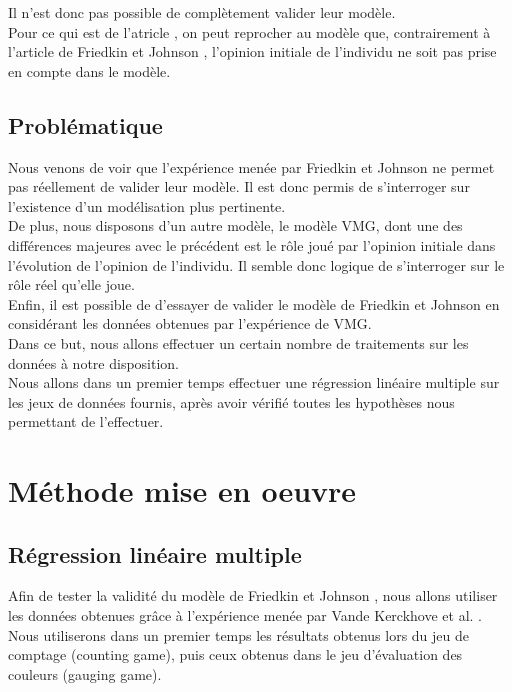 \documentclass{scrreprt}
\begin{document}
\begin{multicols}{2}
Il n'est donc pas possible de complètement valider leur modèle.\\

Pour ce qui est de l'atricle \cite{VMG}, on peut reprocher au modèle que, contrairement à l'article de Friedkin et Johnson \cite{FJ}, l'opinion initiale de l'individu ne soit pas prise en compte dans le modèle.

\section{Problématique}

Nous venons de voir que l’expérience menée par Friedkin et Johnson ne permet pas réellement de valider leur modèle. Il est donc permis de s'interroger sur l'existence d'un modélisation plus pertinente.\\

De plus, nous disposons d’un autre modèle, le modèle VMG, dont une des différences majeures avec le précédent est le rôle joué par l’opinion initiale dans l'évolution de l'opinion de l'individu. Il semble donc logique de s’interroger sur le rôle réel qu’elle joue.\\

Enfin, il est possible de d’essayer de valider le modèle de Friedkin et Johnson en considérant les données obtenues par l’expérience de VMG.\\%

Dans ce but, nous allons effectuer un certain nombre de traitements sur les données à notre disposition. \\

Nous allons dans un premier temps effectuer une régression linéaire multiple sur les jeux de données fournis, après avoir vérifié toutes les hypothèses nous permettant de l'effectuer. \\

\chapter{Méthode mise en oeuvre}

\section{Régression linéaire multiple}

Afin de tester la validité du modèle de Friedkin et Johnson \cite{FJ}, nous allons utiliser les données obtenues grâce à l’expérience menée par Vande Kerckhove et al. \cite{VMG}. Nous utiliserons dans un premier temps les résultats obtenus lors du jeu de comptage (counting game), puis ceux obtenus dans le jeu d’évaluation des couleurs (gauging game).\\


\end{multicols}
\end{document}

